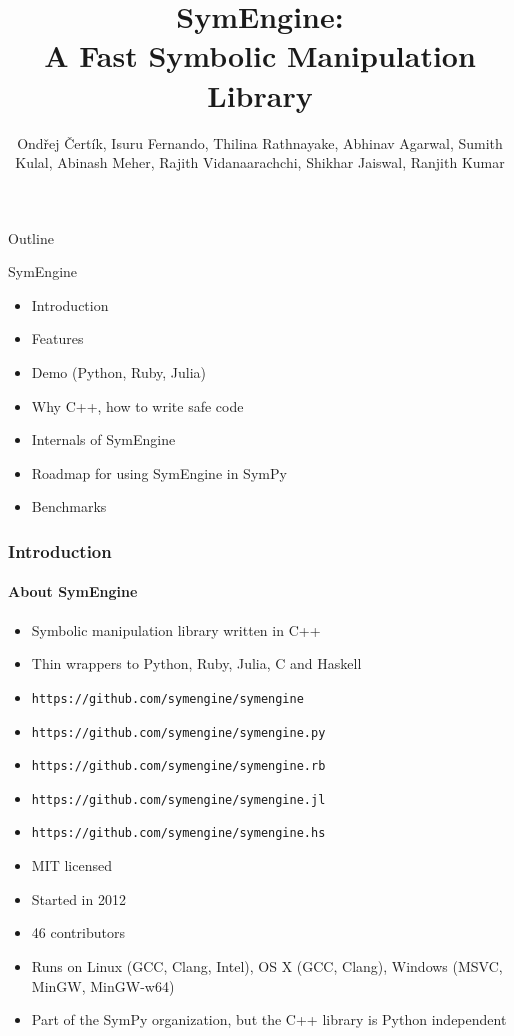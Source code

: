 \documentclass{beamer}
\title[SymEngine \hspace{14em}\insertframenumber/
\inserttotalframenumber]{SymEngine: \\A Fast Symbolic Manipulation Library}
\author[O. Čertík, I. Fernando, ...]{Ondřej Čertík, Isuru Fernando, Thilina Rathnayake, Abhinav Agarwal, Sumith Kulal, Abinash Meher, Rajith Vidanaarachchi, Shikhar Jaiswal, Ranjith Kumar}
\begin{document}
\begin{frame}
\maketitle
\end{frame}


\begin{frame}{Outline}
\begin{block}{SymEngine}
\begin{itemize}
\item Introduction
\item Features
\item Demo (Python, Ruby, Julia)
\item Why C++, how to write safe code
\item Internals of SymEngine
\item Roadmap for using SymEngine in SymPy
\item Benchmarks
\end{itemize}
\end{block}
\end{frame}


\begin{frame}
\frametitle{Introduction}
\framesubtitle{About SymEngine}
\begin{itemize}
\item Symbolic manipulation library written in C++
\item Thin wrappers to Python, Ruby, Julia, C and Haskell
\item \texttt{https://github.com/symengine/symengine}
\item \texttt{https://github.com/symengine/symengine.py}
\item \texttt{https://github.com/symengine/symengine.rb}
\item \texttt{https://github.com/symengine/symengine.jl}
\item \texttt{https://github.com/symengine/symengine.hs}
\item MIT licensed
\item Started in 2012
\item 46 contributors
\item Runs on Linux (GCC, Clang, Intel), OS X (GCC, Clang), Windows (MSVC,
    MinGW, MinGW-w64)
\item Part of the SymPy organization, but the C++ library is Python independent
\end{itemize}
\end{frame}
\end{document}
